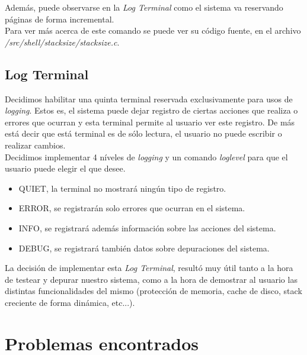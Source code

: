 \documentclass[a4paper,10pt]{article}
\begin{document}
        Además, puede observarse en la \textit{Log Terminal} como el sistema va reservando páginas de forma incremental.\\

        Para ver más acerca de este comando se puede ver su código fuente, en el archivo \textit{/src/shell/stacksize/stacksize.c}.\\


        \subsection{Log Terminal}

        Decidimos habilitar una quinta terminal reservada exclusivamente para usos de \textit{logging}. 
        Estos es, el sistema puede dejar registro de ciertas acciones que realiza o errores que ocurran y esta terminal permite al usuario ver este registro. De más
        está decir que está terminal es de sólo lectura, el usuario no puede escribir o realizar cambios.\\

        Decidimos implementar 4 níveles de \textit{logging} y un comando \textit{loglevel} para que el usuario puede elegir el que desee.\\

        \begin{itemize}
        \item QUIET, la terminal no mostrará ningún tipo de registro.
        \item ERROR, se registrarán solo errores que ocurran en el sistema.
        \item INFO, se registrará además información sobre las acciones del sistema.
        \item DEBUG, se registrará también datos sobre depuraciones del sistema.
        \end{itemize}

        La decisión de implementar esta \textit{Log Terminal}, resultó muy útil tanto a la hora de testear y depurar nuestro sistema, como a la hora de demostrar al 
        usuario las distintas funcionalidades del mismo (protección de memoria, cache de disco, stack creciente de forma dinámica, etc...).\\


\newpage
\section{Problemas encontrados}
\label{sec:Problemas encontrados}
\end{document}

